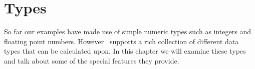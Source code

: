 
\chapter{Types}

So far our examples have made use of simple numeric types such as integers and floating point
numbers. However \CLAC\ supports a rich collection of different data types that can be
calculated upon. In this chapter we will examine these types and talk about some of the special
features they provide.

